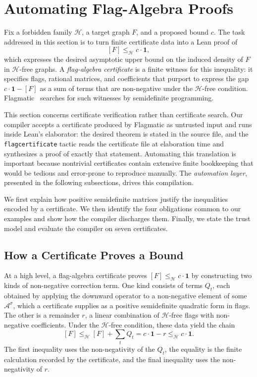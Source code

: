 \documentclass[acmsmall,screen=true,acmthm=false]{acmart}
\DeclareRobustCommand{\lean}[1]{{\def\_{\textunderscore\allowbreak}\texttt{#1}}}
\begin{document}
\section{Automating Flag-Algebra Proofs}
\label{sec:flagmatic}

Fix a forbidden family \(\mathcal H\), a target graph \(F\), and a proposed
bound \(c\).  The task addressed in this section is to turn finite certificate
data into a Lean proof of
\[
  [F]\leq_{\mathcal H}c\cdot\mathbf{1},
\]
which expresses the desired asymptotic upper bound on the induced density of
\(F\) in \(\mathcal H\)-free graphs.  A \emph{flag-algebra certificate} is a
finite witness for this inequality: it specifies flags, rational matrices, and
coefficients that purport to express the gap
\(c\cdot\mathbf{1}-[F]\) as a sum of terms that are non-negative under the
\(\mathcal H\)-free condition.  Flagmatic~\cite{vaughan2013flagmatic} searches
for such witnesses by semidefinite programming.

This section concerns certificate verification rather than certificate
search.  Our compiler accepts a certificate produced by Flagmatic as untrusted
input and runs inside Lean's elaborator: the desired theorem is stated in the
source file, and the \lean{flag\_certificate} tactic reads the certificate
file at elaboration time and synthesizes a proof of exactly that
statement.  Automating this translation is important because nontrivial
certificates contain extensive finite bookkeeping that would be tedious and
error-prone to reproduce manually.  The \emph{automation layer}, presented in
the following subsections, drives this compilation.

We first explain how positive semidefinite matrices justify the inequalities
encoded by a certificate.  We then identify the four obligations common to our
examples and show how the compiler discharges them.  Finally, we state the
trust model and evaluate the compiler on seven certificates.

\subsection{How a Certificate Proves a Bound}
\label{sec:flagmatic-background}

At a high level, a flag-algebra certificate proves
$[F] \leq_{\mathcal H} c\cdot\mathbf{1}$ by constructing two kinds of
non-negative correction term.  One kind consists of terms $Q_t$, each obtained
by applying the downward operator to a non-negative element of some
$\mathcal{A}^\sigma$, which a certificate supplies as a positive semidefinite
quadratic form in flags.  The other is a remainder $r$, a linear combination of
$\mathcal H$-free flags with non-negative coefficients.  Under the
$\mathcal H$-free condition, these data yield the chain
\begin{equation}
  \label{eq:cert-chain}
  [F]
  \leq_{\mathcal H} [F]+\sum_t Q_t
  = c\cdot\mathbf{1}-r
  \leq_{\mathcal H} c\cdot\mathbf{1}.
\end{equation}
The first inequality uses the non-negativity of the $Q_t$, the equality is the
finite calculation recorded by the certificate, and the final inequality uses
the non-negativity of $r$.
\end{document}
